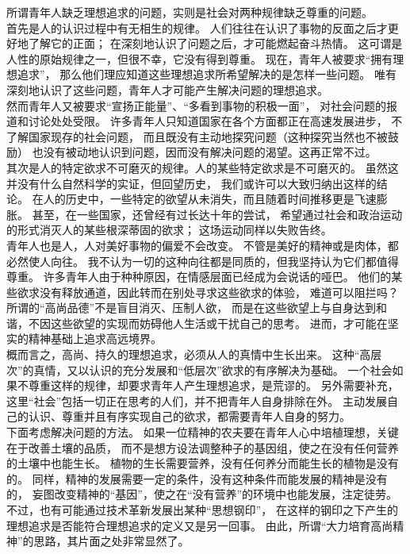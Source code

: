 \documentclass{article}
\begin{document}
所谓青年人缺乏理想追求的问题，实则是社会对两种规律缺乏尊重的问题。\\

首先是人的认识过程中有无相生的规律。
人们往往在认识了事物的反面之后才更好地了解它的正面；
在深刻地认识了问题之后，才可能燃起奋斗热情。
这可谓是人性的原始规律之一，但很不幸，它没有得到尊重。
现在，青年人被要求“拥有理想追求”，
那么他们理应知道这些理想追求所希望解决的是怎样一些问题。
唯有深刻地认识了这些问题，青年人才可能产生解决问题的理想追求。\\

然而青年人又被要求“宣扬正能量”、“多看到事物的积极一面”，
对社会问题的报道和讨论处处受限。
许多青年人只知道国家在各个方面都正在高速发展进步，
不了解国家现存的社会问题，
而且既没有主动地探究问题（这种探究当然也不被鼓励）
也没有被动地认识到问题，因而没有解决问题的渴望。这再正常不过。\\

其次是人的特定欲求不可磨灭的规律。人的某些特定欲求是不可磨灭的。
虽然这并没有什么自然科学的实证，但回望历史，
我们或许可以大致归纳出这样的结论。
在人的历史中，一些特定的欲望从未消失，而且随着时间推移更是飞速膨胀。
甚至，在一些国家，还曾经有过长达十年的尝试，
希望通过社会和政治运动的形式消灭人的某些根深蒂固的欲求；
这场运动同样以失败告终。\\

青年人也是人，人对美好事物的偏爱不会改变。
不管是美好的精神或是肉体，都必然使人向往。
我不认为一切的这种向往都是同质的，但我坚持认为它们都值得尊重。
许多青年人由于种种原因，在情感层面已经成为会说话的哑巴。
他们的某些欲求没有释放通道，因此转而在别处寻求这些欲求的体验，
难道可以阻拦吗？所谓的“高尚品德”不是盲目消灭、压制人欲，
而是在这些欲望上与自身达到和谐，不因这些欲望的实现而妨碍他人生活或干扰自己的思考。
进而，才可能在坚实的精神基础上追求高远境界。\\

概而言之，高尚、持久的理想追求，必须从人的真情中生长出来。
这种“高层次”的真情，又以认识的充分发展和“低层次”欲求的有序解决为基础。
一个社会如果不尊重这样的规律，却要求青年人产生理想追求，是荒谬的。
另外需要补充，这里“社会”包括一切正在思考的人们，并不把青年人自身排除在外。
主动发展自己的认识、尊重并且有序实现自己的欲求，都需要青年人自身的努力。\\

下面考虑解决问题的方法。
如果一位精神的农夫要在青年人心中培植理想，关键在于改善土壤的品质，
而不是想方设法调整种子的基因组，使之在没有任何营养的土壤中也能生长。
植物的生长需要营养，没有任何养分而能生长的植物是没有的。
同样，精神的发展需要一定的条件，没有这种条件而能发展的精神是没有的，
妄图改变精神的“基因”，使之在“没有营养”的环境中也能发展，注定徒劳。
不过，也有可能通过技术革新发展出某种“思想钢印”，
在这样的钢印之下产生的理想追求是否能符合理想追求的定义又是另一回事。
由此，所谓“大力培育高尚精神”的思路，其片面之处非常显然了。\\

\newpage
\end{document}
